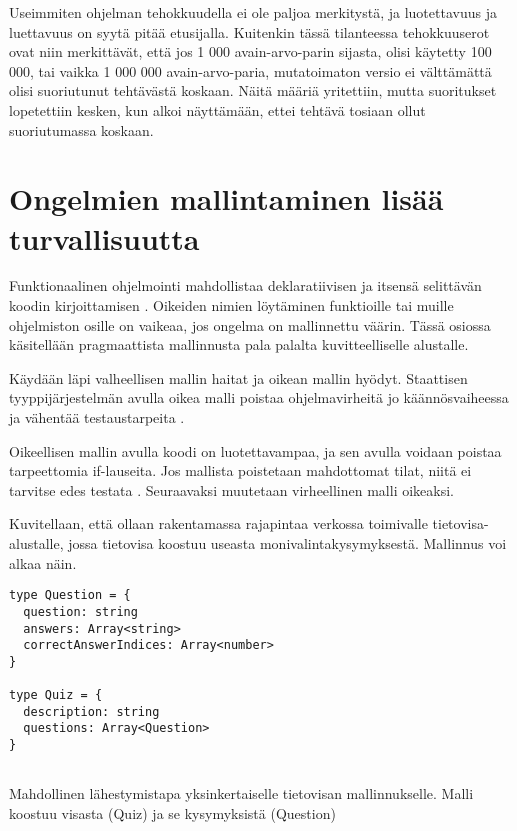 Useimmiten ohjelman tehokkuudella ei ole paljoa merkitystä, ja luotettavuus ja luettavuus on syytä pitää etusijalla. Kuitenkin tässä tilanteessa tehokkuuserot ovat niin merkittävät, että jos 1 000 avain-arvo-parin sijasta, olisi käytetty 100 000, tai vaikka 1 000 000 avain-arvo-paria, mutatoimaton versio ei välttämättä olisi suoriutunut tehtävästä koskaan. Näitä määriä yritettiin, mutta suoritukset lopetettiin kesken, kun alkoi näyttämään, ettei tehtävä tosiaan ollut suoriutumassa koskaan.

\section{Ongelmien mallintaminen lisää turvallisuutta}

Funktionaalinen ohjelmointi mahdollistaa deklaratiivisen ja itsensä selittävän koodin kirjoittamisen \cite{ms:fp_vs_imperative}. Oikeiden nimien löytäminen funktioille tai muille ohjelmiston osille on vaikeaa, jos ongelma on mallinnettu väärin. Tässä osiossa käsitellään pragmaattista mallinnusta pala palalta kuvitteelliselle alustalle.

Käydään läpi valheellisen mallin haitat ja oikean mallin hyödyt. Staattisen tyyppijärjestelmän avulla oikea malli poistaa ohjelmavirheitä jo käännösvaiheessa ja vähentää testaustarpeita \cite{impossiblebetter}.

Oikeellisen mallin avulla koodi on luotettavampaa, ja sen avulla voidaan poistaa tarpeettomia if-lauseita. Jos mallista poistetaan mahdottomat tilat, niitä ei tarvitse edes testata \cite{impossiblebetter}. Seuraavaksi muutetaan virheellinen malli oikeaksi.

Kuvitellaan, että ollaan rakentamassa rajapintaa verkossa toimivalle tietovisa-alustalle, jossa tietovisa koostuu useasta monivalintakysymyksestä. Mallinnus voi alkaa näin.

\begin{code}
    \begin{verbatim}
type Question = {
  question: string
  answers: Array<string>
  correctAnswerIndices: Array<number>
}

type Quiz = {
  description: string
  questions: Array<Question>
}
         
\end{verbatim}
    \caption{Mahdollinen lähestymistapa yksinkertaiselle tietovisan mallinnukselle. Malli koostuu visasta (Quiz) ja se kysymyksistä (Question)}
    \label{code:ts_first_quiz}
\end{code}

